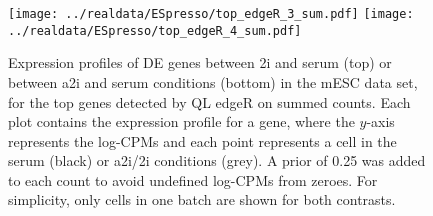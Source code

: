 \documentclass{article}
\begin{document}
\begin{figure}[p]
    \begin{center}
        \texttt{[image: ../realdata/ESpresso/top\_edgeR\_3\_sum.pdf]}
        \texttt{[image: ../realdata/ESpresso/top\_edgeR\_4\_sum.pdf]}
    \end{center}
\caption{
    Expression profiles of DE genes between 2i and serum (top) or between a2i and serum conditions (bottom) in the mESC data set, 
        for the top genes detected by QL edgeR on summed counts.
    Each plot contains the expression profile for a gene, where the $y$-axis represents the log-CPMs and each point represents a cell in the serum (black) or a2i/2i conditions (grey).
    A prior of 0.25 was added to each count to avoid undefined log-CPMs from zeroes.
    For simplicity, only cells in one batch are shown for both contrasts.
}
\label{fig:realdata}
\end{figure}

 
\end{document}
